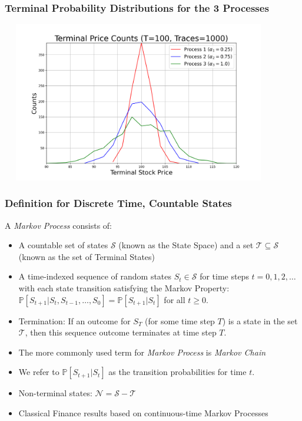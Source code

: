 \documentclass[handout]{beamer}
\begin{document}
\begin{frame}
\frametitle{Terminal Probability Distributions for the 3 Processes}
\includegraphics[width=12cm, height=7cm]{terminal_distribution.png}
\end{frame}

\begin{frame}
\frametitle{Definition for Discrete Time, Countable States}
\pause
\begin{definition}
A {\em Markov Process} consists of:
\begin{itemize}
\item A countable set of states $\mathcal{S}$ (known as the State Space) and a set $\mathcal{T} \subseteq \mathcal{S}$ (known as the set of Terminal States)
\item A time-indexed sequence of random states $S_t \in \mathcal{S}$ for time steps $t=0, 1, 2, \ldots$ with each state transition satisfying the Markov Property: $\mathbb{P}[S_{t+1}|S_t, S_{t-1}, \ldots, S_0] = \mathbb{P}[S_{t+1}|S_t]$ for all $t \geq 0$.
\item Termination: If an outcome for $S_T$ (for some time step $T$) is a state in the set $\mathcal{T}$, then this sequence outcome terminates at time step $T$.
\end{itemize}
\end{definition}
\pause
\begin{itemize}[<+->]
\item The more commonly used term for {\em Markov Process} is {\em Markov Chain}
\item We refer to $\mathbb{P}[S_{t+1}|S_t]$ as the transition probabilities for time $t$.
\item Non-terminal states: $\mathcal{N} = \mathcal{S} - \mathcal{T}$
\item Classical Finance results based on continuous-time Markov Processes
\end{itemize}
\end{frame}
\end{document}
